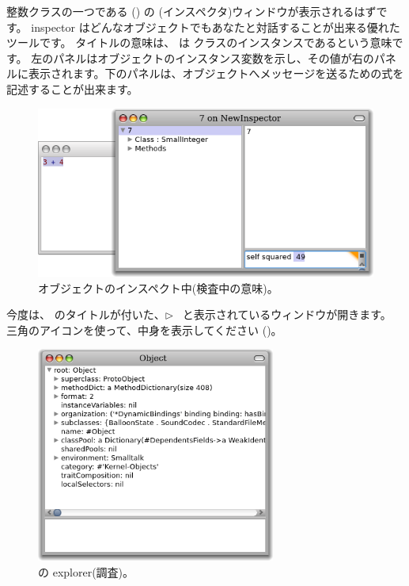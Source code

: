 \documentclass[a4paper,10pt,twoside]{book}
\begin{document}
\noindent
整数クラスの一つである  () の (インスペクタ)ウィンドウが表示されるはずです。
inspector はどんなオブジェクトでもあなたと対話することが出来る優れたツールです。
タイトルの意味は、 は  クラスのインスタンスであるという意味です。
左のパネルはオブジェクトのインスタンス変数を示し、その値が右のパネルに表示されます。下のパネルは、オブジェクトへメッセージを送るための式を記述することが出来ます。

\begin{figure}[htb]
\centerline {\includegraphics[width=\textwidth]{InspectIt}}
\caption{オブジェクトのインスペクト中(検査中の意味)。 }
\end{figure}



今度は、 のタイトルが付いた、\mbox{$\triangleright$ } と表示されているウィンドウが開きます。
三角のアイコンを使って、中身を表示してください ()。

\begin{figure}[htb]
\centerline {\includegraphics[width=0.7\textwidth]{ExploreIt}}
\caption{ の explorer(調査)。}
\end{figure}
\end{document}

